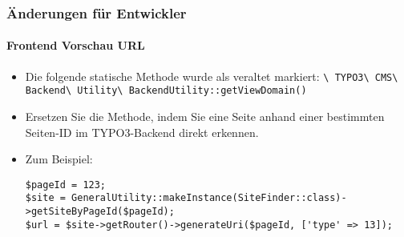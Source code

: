\begin{frame}[fragile]
	\frametitle{Änderungen für Entwickler}
	\framesubtitle{Frontend Vorschau URL}

	\lstset{basicstyle=\tiny\ttfamily}

	\begin{itemize}
		\item Die folgende statische Methode wurde als veraltet markiert:\newline
			\smaller\texttt{\textbackslash
				TYPO3\textbackslash
				CMS\textbackslash
				Backend\textbackslash
				Utility\textbackslash
				BackendUtility::getViewDomain()}\normalsize

		\item Ersetzen Sie die Methode, indem Sie eine Seite anhand einer bestimmten Seiten-ID im TYPO3-Backend direkt erkennen.
		\item Zum Beispiel:

\begin{lstlisting}
$pageId = 123;
$site = GeneralUtility::makeInstance(SiteFinder::class)->getSiteByPageId($pageId);
$url = $site->getRouter()->generateUri($pageId, ['type' => 13]);
\end{lstlisting}

	\end{itemize}

\end{frame}


